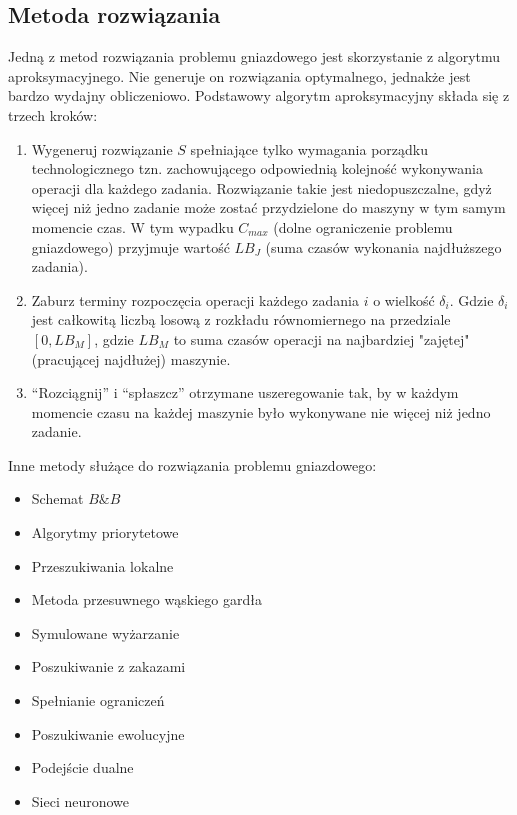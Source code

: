 	\subsection{Metoda rozwiązania}
		Jedną z metod rozwiązania problemu gniazdowego jest skorzystanie z algorytmu aproksymacyjnego.
		Nie generuje on rozwiązania optymalnego, jednakże jest bardzo wydajny obliczeniowo.
		Podstawowy algorytm aproksymacyjny składa się  z trzech kroków:
		\begin{enumerate}
			\item Wygeneruj rozwiązanie $S$ spełniające tylko wymagania porządku technologicznego tzn. zachowującego
			odpowiednią kolejność wykonywania operacji dla każdego zadania. Rozwiązanie takie jest niedopuszczalne, gdyż
			więcej niż jedno zadanie może zostać przydzielone do maszyny w tym samym momencie czas.
			W tym wypadku $C_{max}$ (dolne ograniczenie problemu gniazdowego) przyjmuje wartość $LB_J$ (suma czasów 
			wykonania najdłuższego zadania).
			\item Zaburz terminy rozpoczęcia operacji każdego zadania $i$ o wielkość $\delta_i$. Gdzie $\delta_i$
			jest całkowitą liczbą losową z rozkładu równomiernego na przedziale $[0, LB_M]$, gdzie $LB_M$ to suma czasów
			operacji na najbardziej "zajętej" (pracującej najdłużej) maszynie.
			\item “Rozciągnij” i “spłaszcz” otrzymane uszeregowanie tak, by w każdym
			momencie czasu na każdej maszynie było wykonywane nie więcej niż
			jedno zadanie.
		\end{enumerate}
		
		Inne metody służące do rozwiązania problemu gniazdowego:
		\begin{itemize}
			\item Schemat $B\&B$
			\item Algorytmy priorytetowe
			\item Przeszukiwania lokalne
			\item Metoda przesuwnego wąskiego gardła
			\item Symulowane wyżarzanie
			\item Poszukiwanie z zakazami
			\item Spełnianie ograniczeń
			\item Poszukiwanie ewolucyjne
			\item Podejście dualne
			\item Sieci neuronowe
		\end{itemize}